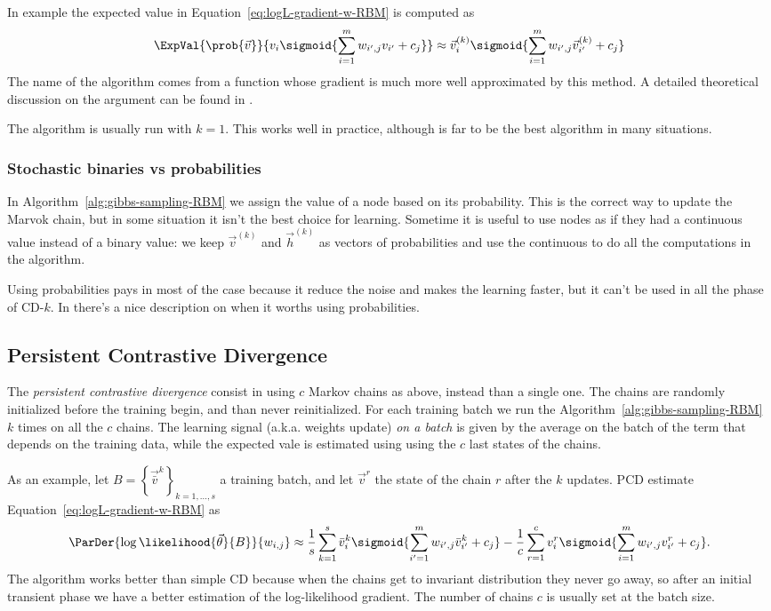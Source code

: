   In example the expected value in Equation~\eqref{eq:logL-gradient-w-RBM} is computed as
  \[
    \ExpVal{\prob{\vec{v}}}{v_i \sigmoid{\sum_{i=1}^m w_{i',j}v_{i'}+c_j}} \approx
      \vec{v}^{(k)}_i \sigmoid{\sum_{i=1}^m w_{i',j}\vec{v}^{(k)}_{i'}+c_j}
  \]
  The name of the algorithm comes from a function whose gradient is much more well approximated
  by this method. A detailed theoretical discussion on the argument can be found in
  \cite{fischer2012introduction}.
  
  The algorithm is usually run with \(k=1\). This works well in practice, although is far to be
  the best algorithm in many situations.
  
  \subsubsection*{Stochastic binaries vs probabilities}
  In Algorithm~\ref{alg:gibbs-sampling-RBM} we assign the value of a node based on its probability.
  This is the correct way to update the Marvok chain,  but in some situation it isn't the best
  choice for learning. Sometime it is useful to use nodes as if they had a continuous value
  instead of a binary value: we keep \(\vec{v}^{(k)}\) and \(\vec{h}^{(k)}\) as vectors of
  probabilities and use the continuous to do all the computations in the algorithm.
  
  Using probabilities pays in most of the case because it reduce the noise and makes the learning
  faster, but it can't be used in all the phase of CD-\(k\). In \cite{hinton2012practical} there's
  a nice description on when it worths using probabilities.
  
  
  \subsection{Persistent Contrastive Divergence}
  The \emph{persistent contrastive divergence} consist in using \(c\) Markov chains as above,
  instead than a single one. The chains are randomly initialized before the training begin,
  and than never reinitialized. For each training batch we run the Algorithm~\ref{alg:gibbs-sampling-RBM}
  \(k\) times on all the \(c\) chains. The learning signal (a.k.a. weights update) \emph{on a batch}
  is given by the average on the batch of the term that depends on the training data,
  while the expected vale is estimated using using the \(c\) last states of the chains.
  
  As an example, let \(B = \left\{\vec{\bar{v}}^k\right\}_{k = 1, \dots, s}\) a training batch, and let
  \(\vec{v}^r\) the state of the chain \(r\) after the \(k\) updates. 
  PCD estimate  Equation~\eqref{eq:logL-gradient-w-RBM} as
  \[
    \ParDer{\log\likelihood{\vec{\theta}}{B}}{w_{i,j}} \approx
      \frac{1}{s}\sum_{k=1}^s{\bar{v}^k_i} \sigmoid{\sum_{i'=1}^m w_{i',j}{\bar{v}^k_{i'}}+c_j}
      -\frac{1}{c}\sum_{r=1}^c v^r_i \sigmoid{\sum_{i=1}^m w_{i',j}v^r_{i'}+c_j}.
  \]
  The algorithm works better than simple CD because when the chains get to invariant distribution
  they never go away, so after an initial transient phase we have a better estimation of
  the log-likelihood gradient. The number of chains \(c\) is usually set at the batch size.
  
